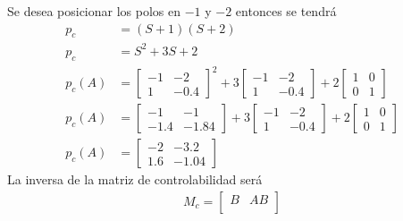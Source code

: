 \documentclass[12pt]{article}
\begin{document}
\begin{itemize}
    Se desea posicionar los polos en $-1$ y $-2$ entonces se tendrá 
    \begin{equation}
        \begin{split}
            p_{c}&=(S+1)(S+2)\\
            p_{c}&=S^{2}+3S+2\\
            p_{c}(A)&=
            \begin{bmatrix}
                -1 & -2 \\
                1 & -0.4
            \end{bmatrix}^2
            +3\begin{bmatrix}
                -1 & -2 \\
                1 & -0.4
            \end{bmatrix}
            +2\begin{bmatrix}
                1 & 0 \\
                0 & 1
            \end{bmatrix}\\
            p_{c}(A)&=
            \begin{bmatrix}
                -1 & -1 \\
                -1.4 & -1.84
            \end{bmatrix}
            +3\begin{bmatrix}
                -1 & -2 \\
                1 & -0.4
            \end{bmatrix}
            +2\begin{bmatrix}
                1 & 0 \\
                0 & 1
            \end{bmatrix}\\
            p_{c}(A)&=
            \begin{bmatrix}
                -2 & -3.2 \\
                1.6 & -1.04
            \end{bmatrix}
        \end{split}
        \label{eq:polo_ejem1}
    \end{equation}
    La inversa de la matriz de controlabilidad será
    \begin{equation}
        \begin{split}
            M_{c}=
            \begin{bmatrix}
                B & AB \\
            \end{bmatrix}\\

\end{split}
\end{equation}
\end{itemize}
\end{document}
